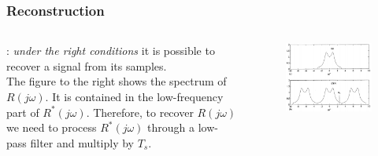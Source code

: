\begin{frame}
	\frametitle{Reconstruction}
	\begin{columns}
		\begin{column}{0.4\textwidth}
		\underline{}: \textit{under the right conditions} it is possible to recover a signal from its samples.\\
		\vspace{1em}
		The figure to the right shows the spectrum of $R(j\omega)$. It is contained in the low-frequency part of $R^*(j\omega)$. Therefore, to recover $R(j\omega)$ we need to process $R^*(j\omega)$ through a low-pass filter and multiply by $T_s$.\\
		\end{column}
		\begin{column}{0.6\textwidth}
		\vspace{-4ex}
		\begin{figure}
			\centering
			\includegraphics[width=1\linewidth]{reconstruction}
		\end{figure}
		\end{column}
	\end{columns}
\end{frame}

